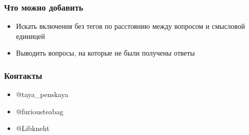 \documentclass[xcolor=table,xetex,mathserif,serif]{beamer}
\begin{document}
\begin{frame}
	\frametitle{Что можно добавить}

	\begin{itemize}
		\item Искать включения без тегов по расстоянию между вопросом и смысловой единицей
		\item Выводить вопросы, на которые не были получены ответы
	\end{itemize}
\end{frame}


\begin{frame}
	\frametitle{Контакты}

	\begin{itemize}
        \item @taya\_penskaya
        \item @furiousteabag
        \item @Libkneht
	\end{itemize}
\end{frame}
\end{document}

